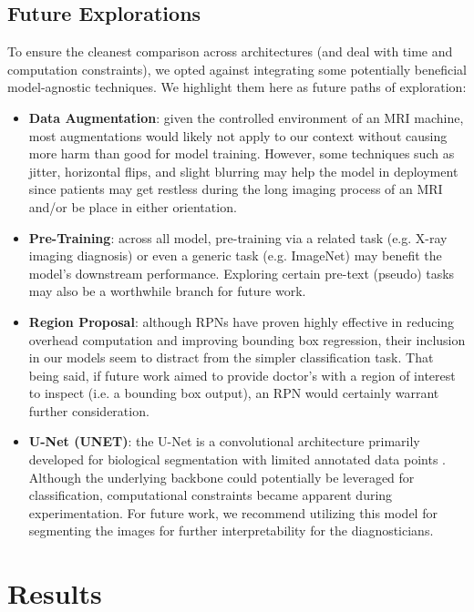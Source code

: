 \documentclass[conference]{IEEEtran}
\begin{document}
\subsection{Future Explorations}
To ensure the cleanest comparison across architectures (and deal with time and computation constraints), we opted against integrating some potentially beneficial model-agnostic techniques. We highlight them here as future paths of exploration:
\begin{itemize}
    \item \textbf{Data Augmentation}: given the controlled environment of an MRI machine, most augmentations would likely not apply to our context without causing more harm than good for model training. However, some techniques such as jitter, horizontal flips, and slight blurring may help the model in deployment since patients may get restless during the long imaging process of an MRI and/or be place in either orientation.

    \item \textbf{Pre-Training}: across all model, pre-training via a related task (e.g. X-ray imaging diagnosis) or even a generic task (e.g. ImageNet) may benefit the model's downstream performance. Exploring certain pre-text (pseudo) tasks may also be a worthwhile branch for future work.

    \item \textbf{Region Proposal}: although RPNs have proven highly effective in reducing overhead computation and improving bounding box regression, their inclusion in our models seem to distract from the simpler classification task. That being said, if future work aimed to provide doctor's with a region of interest to inspect (i.e. a bounding box output), an RPN would certainly warrant further consideration.

    \item \textbf{U-Net (UNET)}: the U-Net is a convolutional architecture primarily developed for biological segmentation with limited annotated data points \cite{unet}. Although the underlying backbone could potentially be leveraged for classification, computational constraints became apparent during experimentation. For future work, we recommend utilizing this model for segmenting the images for further interpretability for the diagnosticians.
\end{itemize}


\section{Results}
\end{document}
